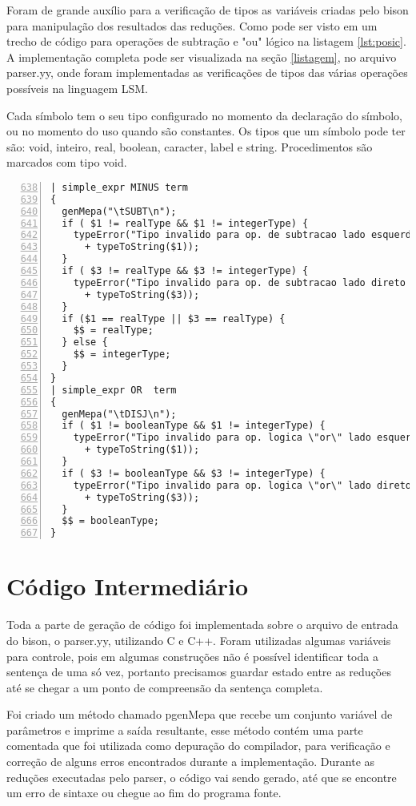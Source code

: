 \documentclass[12pt,a4paper]{article}
\begin{document}
Foram de grande auxílio para a verificação de tipos as variáveis criadas pelo bison para manipulação dos resultados das reduções. Como pode ser visto em um trecho de código para operações de subtração e "ou" lógico na listagem \ref{lst:posic}. A implementação completa pode ser visualizada na seção \ref{listagem}, no arquivo parser.yy, onde foram implementadas as verificações de tipos das várias operações possíveis na linguagem LSM. 

Cada símbolo tem o seu tipo configurado no momento da declaração do símbolo, ou no momento do uso quando são constantes. Os tipos que um símbolo pode ter são: void, inteiro, real, boolean, caracter, label e string. Procedimentos são marcados com tipo void.


\lstset{language=C++, breaklines=true}
\begin{lstlisting}[caption={Verificação de tipos},frame=single,label={lst:posic},numbers=left,firstnumber=638]
| simple_expr MINUS term
{
  genMepa("\tSUBT\n");
  if ( $1 != realType && $1 != integerType) {
    typeError("Tipo invalido para op. de subtracao lado esquerdo "
      + typeToString($1));
  }
  if ( $3 != realType && $3 != integerType) {
    typeError("Tipo invalido para op. de subtracao lado direto "
      + typeToString($3));
  }
  if ($1 == realType || $3 == realType) {
    $$ = realType;
  } else {
    $$ = integerType;
  }
}
| simple_expr OR  term
{
  genMepa("\tDISJ\n");
  if ( $1 != booleanType && $1 != integerType) {
    typeError("Tipo invalido para op. logica \"or\" lado esquerdo "
      + typeToString($1));
  }
  if ( $3 != booleanType && $3 != integerType) {
    typeError("Tipo invalido para op. logica \"or\" lado direto "
      + typeToString($3));
  }
  $$ = booleanType;
}
\end{lstlisting}

\section{Código Intermediário}

Toda a parte de geração de código foi implementada sobre o arquivo de entrada do bison, o parser.yy, utilizando C e C++. Foram utilizadas algumas variáveis para controle, pois em algumas construções não é possível identificar toda a sentença de uma só vez, portanto precisamos guardar estado entre as reduções até se chegar a um ponto de compreensão da sentença completa.

Foi criado um método chamado pgenMepa que recebe um conjunto variável de parâmetros e imprime a saída resultante, esse método contém uma parte comentada que foi utilizada como depuração do compilador, para verificação e correção de alguns erros encontrados durante a implementação. Durante as reduções executadas pelo parser, o código vai sendo gerado, até que se encontre um erro de sintaxe ou chegue ao fim do programa fonte.
\end{document}
